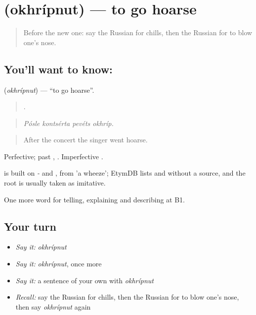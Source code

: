 \section[\texorpdfstring{\ru{охрипнуть} (okhrípnut)}{охрипнуть (okhrípnut)}]{ (okhrípnut) — to go hoarse}

\label{lesson:RU-C486-okhripnut}



\begin{quote}
Before the new one: say the Russian for chills, then the Russian for to blow one's nose.
\end{quote}

\subsection*{You'll want to know: }
\textbf{} (\emph{okhrípnut}) — \textquotedblleft{}to go hoarse\textquotedblright{}.

\begin{quote}
   .
\end{quote}

\begin{quote}
\emph{Pósle kontsérta pevéts okhríp.}
\end{quote}

\begin{quote}
After the concert the singer went hoarse.
\end{quote}

Perfective; past , . Imperfective .

\begin{cousinweb}
\emph{} is built on \emph{-} and \emph{}, from \emph{} 'a wheeze'; EtymDB lists \emph{} and \emph{} without a source, and the root is usually taken as imitative.
\end{cousinweb}

\begin{grammarlens}[title={What you've built}]
One more word for telling, explaining and describing at B1.
\end{grammarlens}

\subsection*{Your turn}
\begin{itemize}
\raggedright
  \item \emph{Say it:} \emph{okhrípnut}
  \item \emph{Say it:} \emph{okhrípnut}, once more
  \item \emph{Say it:} a sentence of your own with \emph{okhrípnut}
  \item \emph{Recall:} say the Russian for chills, then the Russian for to blow one's nose, then say \emph{okhrípnut} again
\end{itemize}

